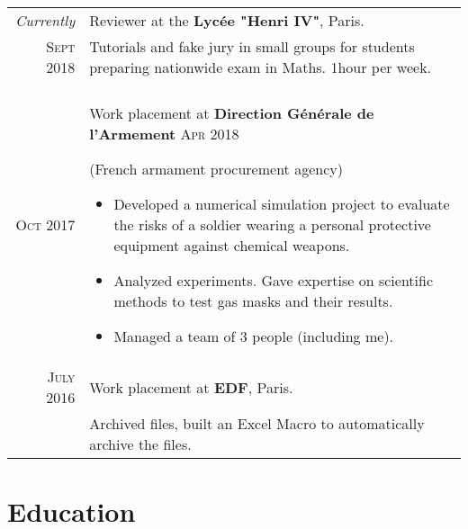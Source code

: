 \documentclass[a4paper,10pt]{article} %
\begin{document}
\begin{tabularx}{\linewidth}{r|X}
  \emph{Currently} & Reviewer at the \textbf{Lycée "Henri IV"}, Paris.\\
  \textsc{Sept 2018} & \small{Tutorials and fake jury in small groups for students preparing nationwide exam in Maths. 1hour per week.}
  \\&\\

\textsc{Oct 2017} & Work placement at \textbf{Direction Générale de l'Armement}
\textsc{Apr 2018}  \small{(French armament procurement agency)
\begin{itemize}[noitemsep, nolistsep, leftmargin=0.5cm]
  \item Developed a numerical simulation project to evaluate the risks of a soldier wearing a personal protective equipment against chemical weapons.
  \item Analyzed experiments. Gave expertise on scientific methods to test gas masks and their results.
  \item Managed a team of 3 people (including me).
\end{itemize}}\\


\textsc{July 2016} & Work placement at \textbf{EDF}, Paris. \\
& \small{Archived files, built an Excel Macro to automatically archive the files.}
\end{tabularx}


\section{Education}
\end{document}
